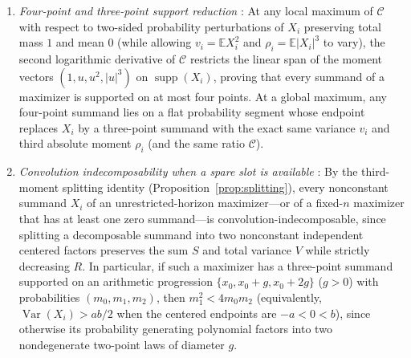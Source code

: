 \documentclass[11pt]{article}
\numberwithin{equation}{section}
\theoremstyle{definition}
\theoremstyle{remark}
\DeclareMathOperator{\Var}{Var}
\DeclareMathOperator{\supp}{supp}
\newcommand{\E}{\mathbb E}
\begin{document}
\begin{enumerate}[label=(\arabic*),leftmargin=2em]
\item \emph{Four-point and three-point support reduction}
\citep[Theorem~3.2]{BellExtremizers2026}: At any local maximum of $\mathcal C$
with respect to two-sided probability perturbations of $X_i$ preserving total
mass $1$ and mean $0$ (while allowing $v_i=\E X_i^2$ and $\rho_i=\E|X_i|^3$
to vary), the second logarithmic derivative of $\mathcal C$ restricts the
linear span of the moment vectors $(1,u,u^2,|u|^3)$ on $\supp(X_i)$, proving
that every summand of a maximizer is supported on at most four points. At a
global maximum, any four-point summand lies on a flat probability segment
whose endpoint replaces $X_i$ by a three-point summand with the exact same
variance $v_i$ and third absolute moment $\rho_i$ (and the same ratio
$\mathcal C$).

\item \emph{Convolution indecomposability when a spare slot is available}
\citep[Corollary~3.4]{BellExtremizers2026}: By the third-moment splitting
identity (Proposition~\ref{prop:splitting}), every nonconstant summand $X_i$
of an unrestricted-horizon maximizer---or of a fixed-$n$ maximizer that has at
least one zero summand---is convolution-indecomposable, since splitting a
decomposable summand into two nonconstant independent centered factors
preserves the sum $S$ and total variance $V$ while strictly decreasing $R$.
In particular, if such a maximizer has a three-point summand supported on an
arithmetic progression $\{x_0,x_0+g,x_0+2g\}$ ($g>0$) with probabilities
$(m_0,m_1,m_2)$, then $m_1^2<4m_0m_2$ (equivalently, $\Var(X_i)>ab/2$ when
the centered endpoints are $-a<0<b$), since otherwise its probability
generating polynomial factors into two nondegenerate two-point laws of
diameter $g$.
\end{enumerate}
\end{document}
